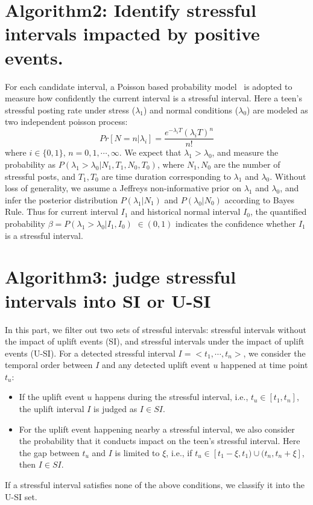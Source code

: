 \section{Algorithm2: Identify stressful intervals impacted by positive events.}
\label{alg:alg2}
For each candidate interval,
a Poisson based probability model~\cite{Li2017Analyzing} is adopted to measure how confidently the current interval is a stressful interval.
Here a teen's stressful posting rate under stress ($\lambda_1$) and normal conditions ($\lambda_0$) are modeled as two independent poisson process:
\begin{equation}
Pr[N=n|\lambda_i]=\frac{e^{-\lambda_i T}{(\lambda_i T)}^n}{n!}
\end{equation}
where $i\in\{0,1\}$, $n=0,1,\cdots,\infty$.
We expect that $\lambda_1 > \lambda_0$, and measure the probability as $P(\lambda_1>\lambda_0|N_1, T_1, N_0, T_0)$,
where $N_1, N_0$ are the number of stressful posts, and $T_1, T_0$ are time duration corresponding to $\lambda_1$ and $\lambda_0$.
Without loss of generality, we assume a Jeffreys non-informative prior on $\lambda_1$ and $\lambda_0$,
and infer the posterior distribution $P(\lambda_1|N_1)$ and $P(\lambda_0|N_0)$ according to Bayes Rule.
Thus for current interval $I_1$ and historical normal interval $I_0$,
the quantified probability $\beta = P(\lambda_1>\lambda_0|I_1,I_0)$ $\in (0,1)$ indicates the confidence whether $I_1$ is a stressful interval.


\section{Algorithm3: judge stressful intervals into SI or U-SI}
\label{alg:alg3}
In this part, we filter out two sets of stressful intervals: stressful intervals without the impact of uplift events (SI),
and stressful intervals under the impact of uplift events (U-SI).
For a detected stressful interval $I = <t_1,\cdots,t_n>$, we consider the temporal order between $I$ and any detected uplift event $u$ happened at time point $t_u$:
\begin{itemize}
\item If the uplift event $u$ happens during the stressful interval, i.e., $t_u \in [t_1,t_n]$, the uplift interval $I$ is judged as $I \in SI$.
\item For the uplift event happening nearby a stressful interval,
we also consider the probability that it conducts impact on the teen's stressful interval.
Here the gap between $t_u$ and $I$ is limited to $\xi$, i.e.,
if $t_u \in [t_{1}-\xi, t_1)\cup(t_{n},t_{n}+\xi]$, then $I \in SI$.
\end{itemize}
If a stressful interval satisfies none of the above conditions, we classify it into the U-SI set.


